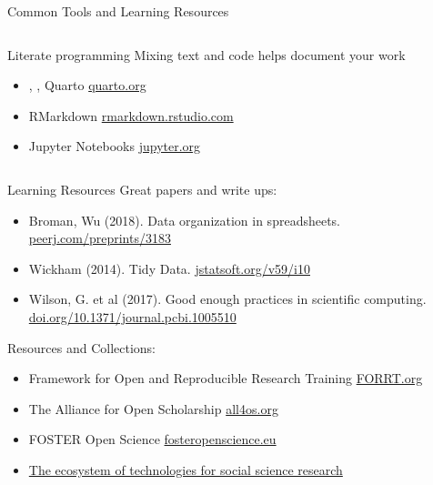 \begin{block}{Common Tools and Learning Resources}
\begin{columns}[t]
\begin{column}{.45\linewidth}
    \begin{subblock}{\hfill Literate programming\hfill {}}
      Mixing text and code helps document your work \\ 
      \begin{itemize}
        \item {}, ,   Quarto \href{https://quarto.org/}{quarto.org}
        \item {} RMarkdown \href{https://rmarkdown.rstudio.com/}{rmarkdown.rstudio.com}
        \item {} Jupyter Notebooks \href{https://jupyter.org/}{jupyter.org}
      \end{itemize}  
    \end{subblock}

  \end{column}\hfill\hfill\hfill

\end{columns}

\begin{subblock}{ \hfill Learning Resources\hfill {}}
  Great papers and write ups:
  \begin{itemize}
    \item Broman, Wu (2018). Data organization in spreadsheets. \href{https://peerj.com/preprints/3183/}{peerj.com/preprints/3183}
    \item Wickham (2014). Tidy Data. \href{http://www.jstatsoft.org/v59/i10/}{jstatsoft.org/v59/i10}
    \item Wilson, G. et al (2017). Good enough practices in scientific computing.\\ \href{https://doi.org/10.1371/journal.pcbi.1005510}{doi.org/10.1371/journal.pcbi.1005510}
  \end{itemize}
  
  Resources and Collections:
  \begin{itemize}
    \item Framework for Open and Reproducible Research Training \href{https://forrt.org/glossary/transparency/}{FORRT.org}
    \item The Alliance for Open Scholarship \href{https://www.all4os.org/}{all4os.org}
    \item FOSTER Open Science \href{https://www.fosteropenscience.eu/}{fosteropenscience.eu}
    \item \href{https://sagepublishing.github.io/sage_tools_social_science/}{The ecosystem of technologies for social science research}
  \end{itemize}



\end{subblock}
\end{block}
